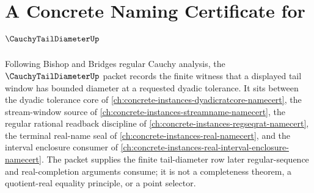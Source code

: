 \chapter{A Concrete Naming Certificate for $\CauchyTailDiameterUp$}
\label{ch:concrete-instances-cauchy-tail-diameter-namecert}

Following Bishop and Bridges regular Cauchy analysis, the $\CauchyTailDiameterUp$ packet records the finite witness that a displayed tail window has bounded diameter at a requested dyadic tolerance. It sits between the dyadic tolerance core of \autoref{ch:concrete-instances-dyadicratcore-namecert}, the stream-window source of \autoref{ch:concrete-instances-streamname-namecert}, the regular rational readback discipline of \autoref{ch:concrete-instances-regseqrat-namecert}, the terminal real-name seal of \autoref{ch:concrete-instances-real-namecert}, and the interval enclosure consumer of \autoref{ch:concrete-instances-real-interval-enclosure-namecert}. The packet supplies the finite tail-diameter row later regular-sequence and real-completion arguments consume; it is not a completeness theorem, a quotient-real equality principle, or a point selector.

